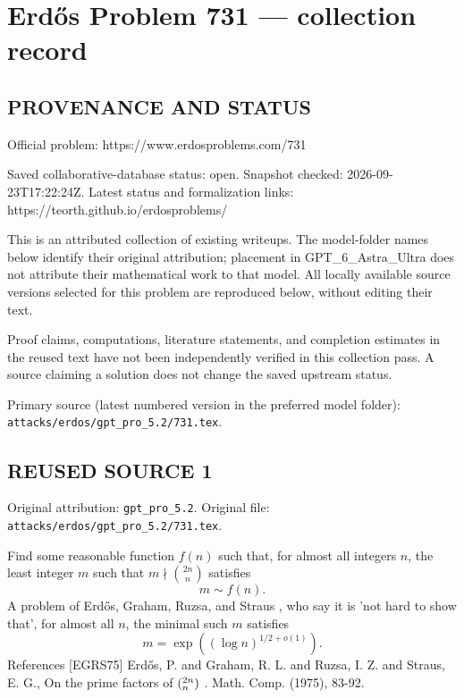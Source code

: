 \section*{Erd\H{o}s Problem 731 --- collection record}

\subsection*{PROVENANCE AND STATUS}
Official problem: https://www.erdosproblems.com/731

Saved collaborative-database status: open.
Snapshot checked: 2026-09-23T17:22:24Z.
Latest status and formalization links: https://teorth.github.io/erdosproblems/

This is an attributed collection of existing writeups. The model-folder names below identify their original attribution; placement in GPT\_6\_Astra\_Ultra does not attribute their mathematical work to that model. All locally available source versions selected for this problem are reproduced below, without editing their text.

Proof claims, computations, literature statements, and completion estimates in the reused text have not been independently verified in this collection pass. A source claiming a solution does not change the saved upstream status.

Primary source (latest numbered version in the preferred model folder): \texttt{attacks/erdos/gpt\_pro\_5.2/731.tex}.

\subsection*{REUSED SOURCE 1}
Original attribution: \texttt{gpt\_pro\_5.2}.
Original file: \texttt{attacks/erdos/gpt\_pro\_5.2/731.tex}.


Find some reasonable function $f(n)$ such that, for almost all integers $n$, the least integer $m$ such that $m\nmid \binom{2n}{n}$ satisfies\[m\sim f(n).\] A problem of Erd\H{o}s, Graham, Ruzsa, and Straus \cite{EGRS75}, who say it is 'not hard to show that', for almost all $n$, the minimal such $m$ satisfies\[m=\exp((\log n)^{1/2+o(1)}).\] References [EGRS75] Erd\H{o}s, P. and Graham, R. L. and Ruzsa, I. Z. and Straus, E. G., On the prime factors of $(\sp{2n}\sb{n})$ . Math. Comp. (1975), 83-92.


